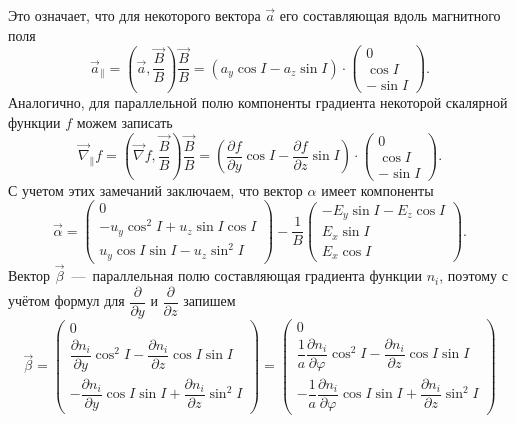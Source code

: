 \documentclass[14pt, a4paper, fleqn]{extarticle}
\begin{document}
Это означает, что для некоторого вектора $\vec{a}$ его составляющая вдоль магнитного поля $$\vec{a}_\parallel = \left(\vec{a},\dfrac{\vec{B}}{B}\right)\dfrac{\vec{B}}{B} = (a_y\cos I - a_z\sin I)\cdot \left(\begin{array}{crl}
0\\
\cos I\\
-\sin I
\end{array}\right).$$
Аналогично, для параллельной полю компоненты градиента некоторой скалярной функции $f$ можем записать $$\vec{\nabla}_\parallel f = \left(\vec{\nabla} f,\dfrac{\vec{B}}{B}\right)\dfrac{\vec{B}}{B} = \left(\dfrac{\partial f}{\partial y}\cos I - \dfrac{\partial f}{\partial z}\sin I\right)\cdot \left(\begin{array}{crl}
0\\
\cos I\\
-\sin I
\end{array}\right).$$
С учетом этих замечаний заключаем, что вектор $\alpha$ имеет компоненты $$\vec{\alpha} = 
\left(\begin{array}{crl}
0\\
-u_y\cos^2 I + u_z\sin I \cos I\\
u_y\cos I \sin I - u_z\sin^2 I
\end{array}\right) - \dfrac{1}{B}
\left(\begin{array}{crl}
-E_y\sin I - E_z\cos I\\
E_x\sin I\\
E_x\cos I
\end{array}\right).$$
Вектор $\vec{\beta}$~---~параллельная полю составляющая градиента функции $n_i$, поэтому с учётом формул для $\dfrac{\partial}{\partial y}$ и $\dfrac{\partial}{\partial z}$ запишем $$\vec{\beta} = \left(\begin{array}{crl}
0\\
\dfrac{\partial n_i}{\partial y}\cos^2 I - \dfrac{\partial n_i}{\partial z}\cos I\sin I\\
-\dfrac{\partial n_i}{\partial y}\cos I\sin I + \dfrac{\partial n_i}{\partial z}\sin^2 I
\end{array}\right) = \left(\begin{array}{crl}
0\\
\dfrac{1}{a}\dfrac{\partial n_i}{\partial \varphi}\cos^2 I - \dfrac{\partial n_i}{\partial z}\cos I\sin I\\
-\dfrac{1}{a}\dfrac{\partial n_i}{\partial \varphi}\cos I\sin I + \dfrac{\partial n_i}{\partial z}\sin^2 I
\end{array}\right)$$
\end{document}
